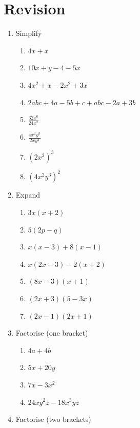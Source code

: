 \documentclass[a4paper,12pt]{article}
\begin{document}
\section{Revision}
\begin{enumerate}
	\item Simplify
\begin{multicols}{2}
	\begin{enumerate}[label=\normalsize \alph*)~~~]
			\item $ 4x +x$ 
			\item $10x + y -4 -5x$ 
			\item $4x^2 +x -2x^2 + 3x$ 
			\item $ 2abc + 4a - 5b + c +abc - 2a + 3b$ 
			\item $ \displaystyle \frac{32x^6}{24x^2}$ 
			\item $ \displaystyle \frac{4x^2y^3}{2xy^4}$ 
			\item $ \left( 2x^2 \right)^3$ 
			\item $ \left( 4x^2y^3 \right)^2$ 
	\end{enumerate}
\end{multicols}
\item Expand
\begin{multicols}{3}
	\begin{enumerate}[label=\normalsize \alph*)~~~]
			\item $ 3x(x+2)$ 
			\item $5(2p-q)$ 
			\item $x(x-3) + 8(x-1)$ 
			\item $ x(2x-3) - 2(x+2)$ 
			\item $ (8x-3)(x+1)$ 
			\item $ (2x + 3)(5-3x)$ 
			\item $ (2x-1)(2x+1)$ 
	\end{enumerate}
\end{multicols}
\item Factorise (one bracket)
\begin{multicols}{2}
	\begin{enumerate}[label=\normalsize \alph*)~~~]
		\item $ 4a + 4b$ 
		\item $5x + 20y$ 
		\item $7x - 3x^2$ 
		\item $ 24xy^2z - 18x^3yz$ 
	\end{enumerate}
\end{multicols}
\item Factorise (two brackets)
\begin{multicols}{2}

\end{multicols}
\end{enumerate}
\end{document}
